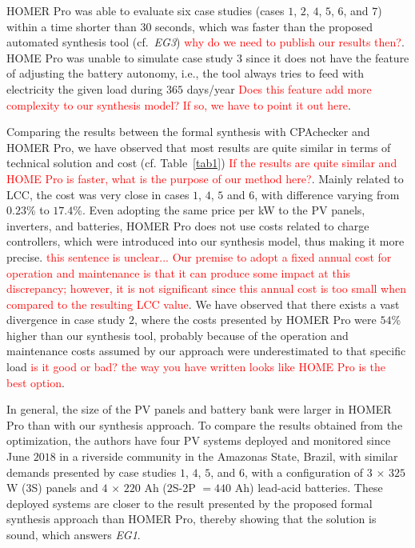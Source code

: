 \documentclass[runningheads]{llncs}
\begin{document}
HOMER Pro was able to evaluate six case studies (cases $1$, $2$, $4$, $5$, $6$, and $7$) within a time shorter than $30$ seconds, which was faster than the proposed automated synthesis tool (cf.~\textit{EG3}) \textcolor{red}{why do we need to publish our results then?}. HOME Pro was unable to simulate case study $3$ since it does not have the feature of adjusting the battery autonomy, i.e., the tool always tries to feed with electricity the given load during $365$ days/year \textcolor{red}{Does this feature add more complexity to our synthesis model? If so, we have to point it out here}. 

Comparing the results between the formal synthesis with CPAchecker and HOMER Pro, we have observed that most results are quite similar in terms of technical solution and cost (cf. Table~\ref{tab1}) \textcolor{red}{If the results are quite similar and HOME Pro is faster, what is the purpose of our method here?}. Mainly related to LCC, the cost was very close in cases $1$, $4$, $5$ and $6$, with difference varying from $0.23$\% to $17.4$\%. Even adopting the same price per kW to the PV panels, inverters, and batteries, HOMER Pro does not use costs related to charge controllers, which were introduced into our synthesis model, thus making it more precise. \textcolor{red}{this sentence is unclear... Our premise to adopt a fixed annual cost for operation and maintenance is that it can produce some impact at this discrepancy; however, it is not significant since this annual cost is too small when compared to the resulting LCC value}. We have observed that there exists a vast divergence in case study $2$, where the costs presented by HOMER Pro were $54$\% higher than our synthesis tool, probably because of the operation and maintenance costs assumed by our approach were underestimated to that specific load \textcolor{red}{is it good or bad? the way you have written looks like HOME Pro is the best option}. 

In general, the size of the PV panels and battery bank were larger in HOMER Pro than with our synthesis approach. To compare the results obtained from the optimization, the authors have four PV systems deployed and monitored since June $2018$ in a riverside community in the Amazonas State, Brazil, with similar demands presented by case studies $1$, $4$, $5$, and $6$, with a configuration of $3$ $\times$ $325$ W ($3$S) panels and $4$ $\times$ $220$ Ah ($2$S-$2$P $= 440$ Ah) lead-acid batteries. These deployed systems are closer to the result presented by the proposed formal synthesis approach than HOMER Pro, thereby showing that the solution is sound, which answers \textit{EG1}.
\end{document}
